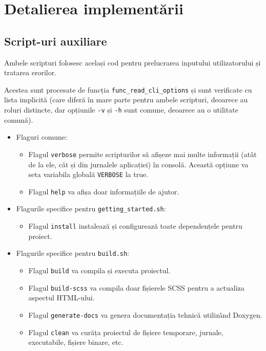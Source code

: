 \chapter{Detalierea implementării}

\section{Script-uri auxiliare}

Ambele scripturi folosesc același cod pentru prelucrarea inputului utilizatorului și tratarea erorilor.

Acestea sunt procesate de funcția \texttt{func\_read\_cli\_options} și sunt verificate cu lista implicită (care diferă în mare parte pentru ambele scripturi, deoarece au roluri distincte, dar opțiunile \texttt{-v} și \texttt{-h} sunt comune, deoarece au o utilitate comună).

\begin{itemize}
  \item Flaguri comune:
    \begin{itemize}
      \item Flagul \texttt{verbose} permite scripturilor să afișeze mai multe informații (atât de la ele, cât și din jurnalele aplicației) în consolă. Această opțiune va seta variabila globală \texttt{VERBOSE} la true.
      \item Flagul \texttt{help} va afișa doar informațiile de ajutor.
    \end{itemize}
  \item Flagurile specifice pentru \texttt{getting\_started.sh}:
    \begin{itemize}
      \item Flagul \texttt{install} instalează și configurează toate dependențele pentru proiect.
    \end{itemize}
  \item Flagurile specifice pentru \texttt{build.sh}:
    \begin{itemize}
      \item Flagul \texttt{build} va compila și executa proiectul.
      \item Flagul \texttt{build-scss} va compila doar fișierele SCSS pentru a actualiza aspectul HTML-ului.
      \item Flagul \texttt{generate-docs} va genera documentația tehnică utilizând Doxygen.
      \item Flagul \texttt{clean} va curăța proiectul de fișiere temporare, jurnale, executabile, fișiere binare, etc.
    \end{itemize}
\end{itemize}

